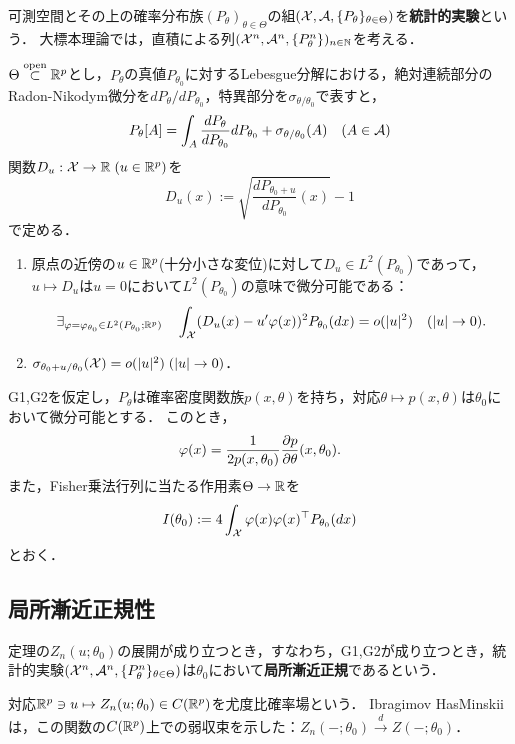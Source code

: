 \documentclass[uplatex,dvipdfmx]{jsreport}
\begin{document}
\begin{definition}
    可測空間とその上の確率分布族$(P_\theta)_{\theta\in\Theta}$の組$(\mathcal{X},\mathcal{A},\{P_\theta\}_{\theta\in\Theta})$を\textbf{統計的実験}という．
    大標本理論では，直積による列$(\mathcal{X}^n,\mathcal{A}^n,\{P_\theta^n\})_{n\in\mathbb{N}}$を考える．
\end{definition}

\begin{notation}[正則性の仮定]
    $\Theta\overset{\mathrm{open}}{\subset}\mathbb{R}^p$とし，$P_\theta$の真値$P_{\theta_0}$に対するLebesgue分解における，絶対連続部分のRadon-Nikodym微分を$dP_\theta/dP_{\theta_0}$，特異部分を$\sigma_{\theta/\theta_0}$で表すと，
    \[P_\theta[A]=\int_A\frac{dP_\theta}{dP_{\theta_0}}dP_{\theta_0}+\sigma_{\theta/\theta_0}(A)\quad(A\in\mathcal{A})\]
    関数$D_u:\mathcal{X}\to\mathbb{R}\;(u\in\mathbb{R}^p)$を
    \[D_u(x):=\sqrt{\frac{dP_{\theta_0+u}}{dP_{\theta_0}}(x)}-1\]
    で定める．
\end{notation}

\begin{enumerate}[({G}1)]
    \item 原点の近傍の$u\in\mathbb{R}^p$(十分小さな変位)に対して$D_u\in L^2(P_{\theta_0})$であって，$u\mapsto D_u$は$u=0$において$L^2(P_{\theta_0})$の意味で微分可能である：
    \[\exists_{\varphi=\varphi_{\theta_0}\in L^2(P_{\theta_0};\mathbb{R}^p)}\quad\int_{\mathcal{X}}(D_u(x)-u'\varphi(x))^2P_{\theta_0}(dx)=o(\lvert u\rvert^2)\quad(\lvert u\rvert\to0).\]
    \item $\sigma_{\theta_0+u/\theta_0}(\mathcal{X})=o(\lvert u\rvert^2)\;(\lvert u\rvert\to0)$．
\end{enumerate}

\begin{lemma}[$L^2$-微分の表示]
    G1,G2を仮定し，$P_\theta$は確率密度関数族$p(x,\theta)$を持ち，対応$\theta\mapsto p(x,\theta)$は$\theta_0$において微分可能とする．
    このとき，
    \[\varphi(x)=\frac{1}{2p(x,\theta_0)}\frac{\partial p}{\partial \theta}(x,\theta_0).\]
    また，Fisher乗法行列に当たる作用素$\Theta\to\mathbb{R}$を
    \[I(\theta_0):=4\int_{\mathcal{X}}\varphi(x)\varphi(x)^\top P_{\theta_0}(dx)\]
    とおく．
\end{lemma}

\begin{lemma}
    
\end{lemma}

\subsection{局所漸近正規性}

\begin{tcolorbox}[colframe=ForestGreen, colback=ForestGreen!10!white,breakable,colbacktitle=ForestGreen!40!white,coltitle=black,fonttitle=\bfseries\sffamily,
title=]
    定理の$Z_n(u;\theta_0)$の展開が成り立つとき，すなわち，G1,G2が成り立つとき，統計的実験$(\mathcal{X}^n,\mathcal{A}^n,\{P^n_\theta\}_{\theta\in\Theta})$は$\theta_0$において\textbf{局所漸近正規}であるという．

    対応$\mathbb{R}^p\ni u\mapsto Z_n(u;\theta_0)\in C(\mathbb{R}^p)$を尤度比確率場という．
    Ibragimov HasMinskiiは，この関数の$C(\mathbb{R}^p)$上での弱収束を示した：$Z_n(-;\theta_0)\xrightarrow{d}Z(-;\theta_0)$．
\end{tcolorbox}
\end{document}
